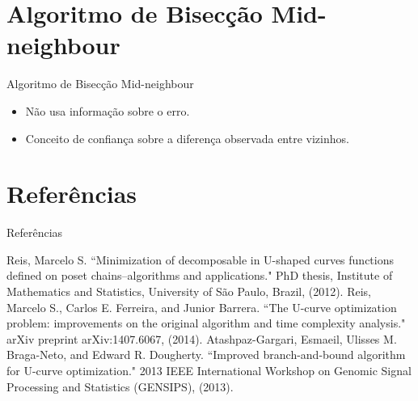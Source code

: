 \documentclass{beamer}
\begin{document}
\section{Algoritmo de Bisecção Mid-neighbour}
\begin{frame}{Algoritmo de Bisecção Mid-neighbour}
    \begin{itemize}
        \item{Não usa informação sobre o erro.}
        \item{Conceito de confiança sobre a diferença observada entre
            vizinhos.}
    \end{itemize}
\end{frame}

\section{Referências}
\begin{frame}{Referências}
\begin{thebibliography}{9} \label{sec:referencias}
Reis, Marcelo S. ``Minimization of decomposable in U-shaped curves 
functions defined on poset chains–algorithms and applications." PhD
thesis, Institute of Mathematics and Statistics, University of São 
Paulo, Brazil, (2012).
Reis, Marcelo S., Carlos E. Ferreira, and Junior Barrera. ``The U-curve
optimization problem: improvements on the original algorithm and time
complexity analysis." arXiv preprint arXiv:1407.6067, (2014). 
Atashpaz-Gargari, Esmaeil, Ulisses M. Braga-Neto, and Edward R.
Dougherty. ``Improved branch-and-bound algorithm for U-curve 
optimization." 2013 IEEE International Workshop on Genomic Signal
Processing and Statistics (GENSIPS), (2013).
\end{thebibliography}
\end{frame}
\end{document}

